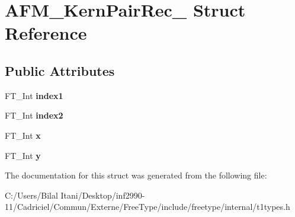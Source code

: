 \hypertarget{struct_a_f_m___kern_pair_rec__}{}\section{A\+F\+M\+\_\+\+Kern\+Pair\+Rec\+\_\+ Struct Reference}
\label{struct_a_f_m___kern_pair_rec__}
\subsection*{Public Attributes}
\begin{DoxyCompactItemize}
\item 
F\+T\+\_\+\+Int {\bfseries index1}\hypertarget{struct_a_f_m___kern_pair_rec___a732bca56dd4a070b1d887ada1637e810}{}\label{struct_a_f_m___kern_pair_rec___a732bca56dd4a070b1d887ada1637e810}

\item 
F\+T\+\_\+\+Int {\bfseries index2}\hypertarget{struct_a_f_m___kern_pair_rec___aee548123779323c255180112c7f5b831}{}\label{struct_a_f_m___kern_pair_rec___aee548123779323c255180112c7f5b831}

\item 
F\+T\+\_\+\+Int {\bfseries x}\hypertarget{struct_a_f_m___kern_pair_rec___a4b7f90a0e17ed89353fec14ddb29fa12}{}\label{struct_a_f_m___kern_pair_rec___a4b7f90a0e17ed89353fec14ddb29fa12}

\item 
F\+T\+\_\+\+Int {\bfseries y}\hypertarget{struct_a_f_m___kern_pair_rec___aa177aa612e79701261eba72c76ea3f08}{}\label{struct_a_f_m___kern_pair_rec___aa177aa612e79701261eba72c76ea3f08}

\end{DoxyCompactItemize}


The documentation for this struct was generated from the following file\+:\begin{DoxyCompactItemize}
\item 
C\+:/\+Users/\+Bilal Itani/\+Desktop/inf2990-\/11/\+Cadriciel/\+Commun/\+Externe/\+Free\+Type/include/freetype/internal/t1types.\+h\end{DoxyCompactItemize}
